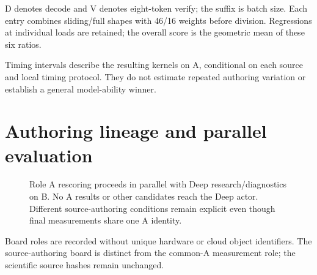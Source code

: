 \documentclass[11pt,letterpaper]{article}
\begin{document}
D denotes decode and V denotes eight-token verify; the suffix is batch size. Each entry combines sliding/full shapes with 46/16 weights before division. Regressions at individual loads are retained; the overall score is the geometric mean of these six ratios.

Timing intervals describe the resulting kernels on A, conditional on each source and local timing protocol. They do not estimate repeated authoring variation or establish a general model-ability winner.

\section{Authoring lineage and parallel evaluation}

\begin{figure}[H]\centering{}\caption{Role A rescoring proceeds in parallel with Deep research/diagnostics on B. No A results or other candidates reach the Deep actor. Different source-authoring conditions remain explicit even though final measurements share one A identity.}\end{figure}

Board roles are recorded without unique hardware or cloud object identifiers. The source-authoring board is distinct from the common-A measurement role; the scientific source hashes remain unchanged.
\end{document}
